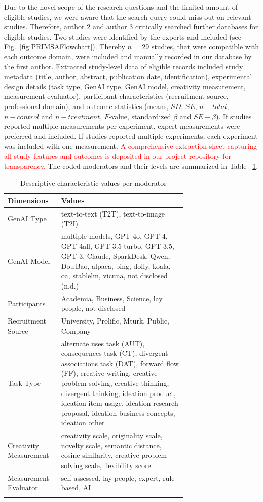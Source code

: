 \documentclass[manuscript, screen, review, acmsmall, anonymous]{acmart}
\newcommand{\TODO}[1]{\textcolor{red}{#1}}
\begin{document}
Due to the novel scope of the research questions and the limited amount of eligible studies, we were aware that the search query could miss out on relevant studies. Therefore, author 2 and author 3 critically searched further databases for eligible studies. Two studies were identified by the experts and included (see Fig.~\ref{fig:PRIMSAFlowchart}). Thereby $n$ = 29 studies, that were compatible with each outcome domain, were included and manually recorded in our database by the first author. Extracted study‐level data of eligible records included study metadata (title, author, abstract, publication date, identification), experimental design details (task type, GenAI type, GenAI model, creativity measurement, measurement evaluator), participant characteristics (recruitment source, professional domain), and outcome statistics (means, $SD$, $SE$, $n-total$, $n-control$ and $n-treatment$, $F$-value, standardized $\beta$ and $SE-\beta$). If studies reported multiple measurements per experiment, expert measurements were preferred and included. If studies reported multiple experiments, each experiment was included with one measurement. \TODO{A comprehensive extraction sheet capturing all study features and outcomes is deposited in our project repository for transparency.} The coded moderators and their levels are summarized in Table ~\ref{tab:moderator_characteristics}. 

\begin{table}[H]
  \centering
  \label{tab:moderator_characteristics}
  \begin{tabular*}{\linewidth}{@{\extracolsep{\fill}} l | p{0.7\linewidth} }
    \toprule
    \textbf{Dimensions} & \textbf{Values} \\
    \midrule
    GenAI Type & text-to-text (T2T), text-to-image (T2I) \\
    \midrule
    GenAI Model & multiple models, GPT-4o, GPT-4, GPT-4all, GPT-3.5-turbo, GPT-3.5, GPT-3, Claude, SparkDesk, Qwen, Dou\,Bao, alpaca, bing, dolly, koala, oa, stablelm, vicuna, not disclosed (n.d.) \\
    \midrule
    Participants & Academia, Business, Science, lay people, not disclosed \\
    \midrule
    Recruitment Source & University, Prolific, Mturk, Public, Company \\
    \midrule
    Task Type & alternate uses task (AUT), consequences task (CT), divergent associations task (DAT), forward flow (FF), creative writing, creative problem solving, creative thinking, divergent thinking, ideation product, ideation item usage, ideation research proposal, ideation business concepts, ideation other\\
    \midrule
    Creativity Measurement & creativity scale, originality scale, novelty scale, semantic distance, cosine similarity, creative problem solving scale, flexibility score \\
     \midrule
    Measurement Evaluator & self-assessed, lay people, expert, rule-based, AI \\
    \addlinespace
    \bottomrule
  \end{tabular*}
  \caption{Descriptive characteristic values per moderator}
\end{table}
\end{document}
